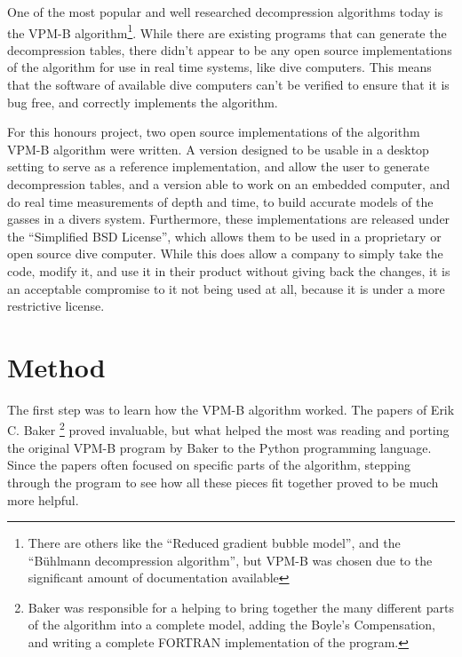 \documentclass[12pt]{article}
\begin{document}
One of the most popular and well researched decompression algorithms today is the VPM-B algorithm\footnote{There are others like the ``Reduced gradient bubble model'', and the ``B\"uhlmann decompression algorithm'', but VPM-B was chosen due to the significant amount of documentation available}. While there are existing programs that can generate the
decompression tables, there didn't appear to be any open source implementations of the algorithm for use in real
time systems, like dive computers. This means that the software of available dive computers can't be verified to
ensure that it is bug free, and correctly implements the algorithm.

For this honours project, two open source implementations of the algorithm VPM-B algorithm were written. A version designed to be
usable in a desktop setting to serve as a reference implementation, and allow the user to generate decompression
tables, and a version able to work on an embedded computer, and do real time measurements of depth and time, to
build accurate models of the gasses in a divers system. Furthermore, these implementations are released under the
``Simplified BSD License'', which allows them to be used in a proprietary or open source dive computer. While
this does allow a company to simply take the code, modify it, and use it in their product without
giving back the changes, it is an acceptable compromise to it not being used at all, because it is under
a more restrictive license.

\section{Method}



 The first step was to learn how the VPM-B algorithm worked. The papers of Erik C. Baker \footnote{Baker was responsible for a helping to bring together the many different
parts of the algorithm into a complete model, adding the Boyle's Compensation, and writing a complete FORTRAN implementation of the program.} proved invaluable, but what helped the most was reading and porting the original VPM-B
program by Baker to the Python programming language. Since the papers often focused on specific parts of the
algorithm, stepping through the program to see how all these pieces fit together proved to be much more helpful.
\end{document}
